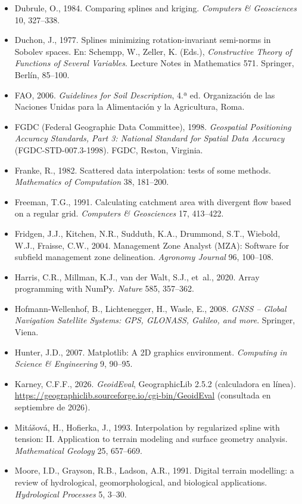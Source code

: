 \documentclass[10pt]{article}
\begin{document}
{\begin{itemize}[label={}, leftmargin=1.2em, itemindent=-1.2em, itemsep=0.45em]
  \item Dubrule, O., 1984. Comparing splines and kriging. \emph{Computers \& Geosciences} 10, 327–338.
  \item Duchon, J., 1977. Splines minimizing rotation-invariant semi-norms in Sobolev spaces. En: Schempp, W., Zeller, K. (Eds.), \emph{Constructive Theory of Functions of Several Variables}. Lecture Notes in Mathematics 571. Springer, Berlín, 85–100.
  \item FAO, 2006. \emph{Guidelines for Soil Description}, 4.ª ed. Organización de las Naciones Unidas para la Alimentación y la Agricultura, Roma.
  \item FGDC (Federal Geographic Data Committee), 1998. \emph{Geospatial Positioning Accuracy Standards, Part 3: National Standard for Spatial Data Accuracy} (FGDC-STD-007.3-1998). FGDC, Reston, Virginia.
  \item Franke, R., 1982. Scattered data interpolation: tests of some methods. \emph{Mathematics of Computation} 38, 181–200.
  \item Freeman, T.G., 1991. Calculating catchment area with divergent flow based on a regular grid. \emph{Computers \& Geosciences} 17, 413–422.
  \item Fridgen, J.J., Kitchen, N.R., Sudduth, K.A., Drummond, S.T., Wiebold, W.J., Fraisse, C.W., 2004. Management Zone Analyst (MZA): Software for subfield management zone delineation. \emph{Agronomy Journal} 96, 100–108.
  \item Harris, C.R., Millman, K.J., van der Walt, S.J., et~al., 2020. Array programming with NumPy. \emph{Nature} 585, 357–362.
  \item Hofmann-Wellenhof, B., Lichtenegger, H., Wasle, E., 2008. \emph{GNSS – Global Navigation Satellite Systems: GPS, GLONASS, Galileo, and more}. Springer, Viena.
  \item Hunter, J.D., 2007. Matplotlib: A 2D graphics environment. \emph{Computing in Science \& Engineering} 9, 90–95.
  \item Karney, C.F.F., 2026. \emph{GeoidEval}, GeographicLib 2.5.2 (calculadora en línea). \url{https://geographiclib.sourceforge.io/cgi-bin/GeoidEval} (consultada en septiembre de 2026).
  \item Mitášová, H., Hofierka, J., 1993. Interpolation by regularized spline with tension: II. Application to terrain modeling and surface geometry analysis. \emph{Mathematical Geology} 25, 657–669.
  \item Moore, I.D., Grayson, R.B., Ladson, A.R., 1991. Digital terrain modelling: a review of hydrological, geomorphological, and biological applications. \emph{Hydrological Processes} 5, 3–30.

\end{itemize}}
\end{document}
